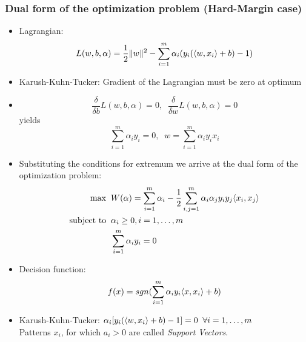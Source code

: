 \documentclass{scrartcl}
\newcommand{\ffrac}[2]{\ensuremath{\frac{\displaystyle #1}{\displaystyle #2}}}
\DeclarePairedDelimiter\norm{\lVert}{\rVert}%
\DeclarePairedDelimiter\inner{\langle}{\rangle}%
\begin{document}
\subsubsection{Dual form of the optimization problem (Hard-Margin case)}
\begin{itemize}
    \item
        Lagrangian:
        $$L(w,b,\alpha) = \ffrac{1}{2}\norm{w}^2-\sum_{i=1}^{m}\alpha_i(y_i(\inner{w,x_i}+b)-1)$$
    \item
        Karush-Kuhn-Tucker: Gradient of the Lagrangian must be zero at optimum
    \item
        $$\ffrac{\delta}{\delta b}L(w,b,\alpha) = 0, \;\; \ffrac{\delta}{\delta w}L(w,b,\alpha) = 0$$
        yields
        $$\sum_{i=1}^{m}\alpha_i y_i = 0, \;\; w = \sum_{i=1}^{m}\alpha_i y_i x_i$$

    \item
        Substituting the conditions for extremum we arrive at the dual form of the optimization problem:
        \begin{align*}
            \max\; \; & W(\alpha) = \sum_{i=1}^{m}\alpha_i - \ffrac{1}{2}\sum_{i,j=1}^{m}\alpha_i \alpha_j y_i y_j \inner{x_i,x_j}\\
						\text{subject to} \; \; & \alpha_i \geq 0, i=1,\dots,m \\%
            & \sum_{i=1}^{m} \alpha_i y_i = 0
        \end{align*}
    \item
        Decision function:
        $$f(x) = sgn(\sum_{i=1}^{m}\alpha_i y_i \inner{x,x_i}+b)$$
    \item
        Karush-Kuhn-Tucker: $\alpha_i[y_i(\inner{w,x_i}+b)-1]=0 \;\;\forall i=1,\dots ,m$\\
        Patterns $x_i$, for which $a_i > 0$ are called \textit{Support Vectors}.
\end{itemize}
\end{document}
